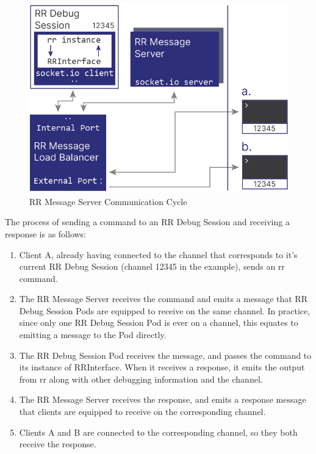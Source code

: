 \documentclass[12pt]{article}
\begin{document}
\begin{figure}[h!]

  \includegraphics[scale=1]{rr_detailed}
  \centering
  \caption{RR Message Server Communication Cycle}
  \label{rr:detailed}
\end{figure}

The process of sending a command to an RR Debug Session and receiving
a response is as follows:

\begin{enumerate}
\item Client A, already having connected to the channel that
  corresponds to it's current RR Debug Session (channel 12345 in the
  example), sends an rr command.
\item The RR Message Server receives the command and emits a message
  that RR Debug Session Pods are equipped to receive on the same
  channel.  In practice, since only one RR Debug Session Pod is ever
  on a channel, this equates to emitting a message to the Pod
  directly.
\item The RR Debug Session Pod receives the message, and passes the
  command to its instance of RRInterface.  When it receives a
  response, it emits the output from rr along with other debugging
  information and the channel.
\item The RR Message Server receives the response, and emits a
  response message that clients are equipped to receive on the
  corresponding channel.
\item Clients A and B are connected to the corresponding channel, so
  they both receive the response.
\end{enumerate}
\end{document}
